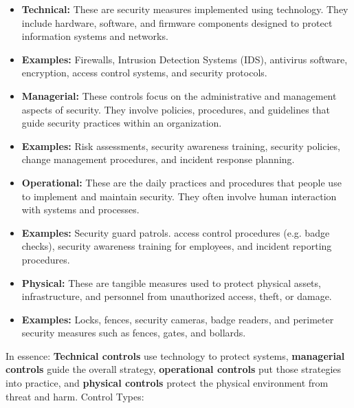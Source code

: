 \begin{itemize}
    \item \textbf{Technical:} These are security measures implemented using technology. They include hardware, software, and firmware components designed to protect information systems and networks.
        \item \textbf{Examples:} Firewalls, Intrusion Detection Systems (IDS), antivirus software, encryption, access control systems, and security protocols.
    \item \textbf{Managerial:} These controls focus on the administrative and management aspects of security. They involve policies, procedures, and guidelines that guide security practices within an organization.
        \item \textbf{Examples:} Risk assessments, security awareness training, security policies, change management procedures, and incident response planning.
    \item \textbf{Operational:} These are the daily practices and procedures that people use to implement and maintain security. They often involve human interaction with systems and processes.
        \item \textbf{Examples:} Security guard patrols. access control procedures (e.g. badge checks), security awareness training for employees, and incident reporting procedures.
    \item \textbf{Physical:} These are tangible measures used to protect physical assets, infrastructure, and personnel from unauthorized access, theft, or damage.
        \item \textbf{Examples:} Locks, fences, security cameras, badge readers, and perimeter security measures such as fences, gates, and bollards.
    \end{itemize}
    In essence: \textbf{Technical controls} use technology to protect systems, \textbf{managerial controls} guide the overall strategy, \textbf{operational controls} put those strategies into practice, and \textbf{physical controls} protect the physical environment from threat and harm.
Control Types:
